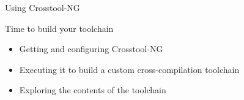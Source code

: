 \setuplabframe
{Using Crosstool-NG}
{
  Time to build your toolchain
  \begin{itemize}
  \item Getting and configuring Crosstool-NG
  \item Executing it to build a custom cross-compilation toolchain
  \item Exploring the contents of the toolchain
  \end{itemize}
}
